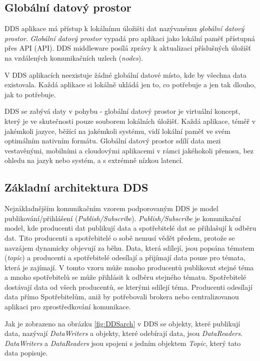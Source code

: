 \subsection{Globální datový prostor}

\acs{DDS} aplikace má přístup k lokálnímu úložišti dat nazývanému \textit{globální datový prostor}. \textit{Globální datový prostor} vypadá pro aplikaci jako lokální paměť přístupná přes \acs{API} (\acl{API}). \acs{DDS} middleware posílá zprávy k aktualizaci příslušných úložišť na vzdálených komunikačních uzlech (\textit{nodes}).

V \acs{DDS} aplikacích neexistuje žádné globální datové místo, kde by všechna data existovala. Každá aplikace si lokálně ukládá jen to, co potřebuje a jen tak dlouho, jak to potřebuje. \cite{DDS_Main}

\acs{DDS} se zabývá daty v pohybu - globální datový prostor je virtuální koncept, který je ve skutečnosti pouze souborem lokálních úložišť. Každá aplikace, téměř v jakémkoli jazyce, běžící na jakémkoli systému, vidí lokální paměť ve svém optimálním nativním formátu. Globální datový prostor sdílí data mezi vestavěnými, mobilními a cloudovými aplikacemi v rámci jakéhokoli přenosu, bez ohledu na jazyk nebo systém, a s extrémně nízkou latencí.

\subsection{Základní architektura \acs{DDS}}

Nejzákladnějším komunikačním vzorem podporovaným \acs{DDS} je model publikování/přihlášení (\textit{Publish/Subscribe}). \textit{Publish/Subscribe} je komunikační model, kde producenti dat publikují data a spotřebitelé dat se přihlašují k odběru dat. Tito producenti a spotřebitelé o sobě nemusí vědět předem, protože se navzájem dynamicky objevují za běhu. Data, která sdílejí, jsou popsána tématem (\textit{topic}) a producenti a spotřebitelé odesílají a přijímají data pouze pro témata, která je zajímají. V tomto vzoru může mnoho producentů publikovat stejné téma a mnoho spotřebitelů se může přihlásit k odběru stejného tématu. Spotřebitelé dostávají data od všech producentů, se kterými sdílejí téma. Producenti odesílají data přímo Spotřebitelům, aniž by potřebovali brokera nebo centralizovanou aplikaci pro zprostředkování komunikace. \cite{DDS_PubSub}

Jak je zobrazeno na obrázku \ref{fig:DDSarch} v \acs{DDS} se objekty, které publikují data, nazývají \textit{DataWriters} a objekty, které odebírají data, jsou \textit{DataReaders}. \textit{DataWriters} a \textit{DataReaders} jsou spojeni s jedním objektem \textit{Topic}, který tato data popisuje.

